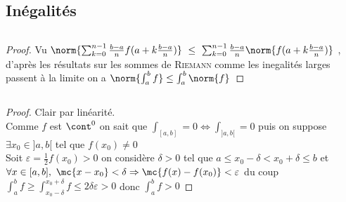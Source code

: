 {\subsection{Inégalités}
    ${}$\\ 
    \begin{proof}
    Vu $\norm{\sum_{k=0}^{n-1} \frac{b-a}{n} f(a+k\frac{b-a}{n})} ~\leq ~\sum_{k=0}^{n-1} \frac{b-a}{n} \norm{f(a+k\frac{b-a}{n})}$ ,  
    d'après les résultats sur les sommes de \textsc{Riemann} comme les inegalités larges passent à la limite on a 
    $\norm{\int_a^b f} \leq \int_a^b \norm{f}$
    \end{proof}
    ${}$ \\ 
    \begin{proof}
    \fbox{$\Rightarrow$} Clair par linéarité. \\ \fbox{$\Leftarrow$} Comme $f$ est $\cont^0$ on sait que $\int_{[a,b]} =0 \Leftrightarrow 
    \int_{]a,b[} =0$ puis on suppose $\exists x_0 \in ]a,b[$ tel que $f(x_0) \neq 0$\\
    Soit $\varepsilon = \frac{1}{2} f(x_0) >0$ on considère $\delta >0$ tel que $a\leq x_0 -\delta < x_0+\delta \leq b$ et\\ $\forall 
    x\in [a,b],~\mc{x-x_0} < \delta \Rightarrow \mc{f(x)-f(x_0)} <\varepsilon$ du coup $\int_a^b f \geq \int_{x_0-\delta}^{x_0+\delta} f \leq 
    2\delta\varepsilon >0$ donc $\int_a^b f >0$
    \end{proof}
    ${}$\\ 
}
